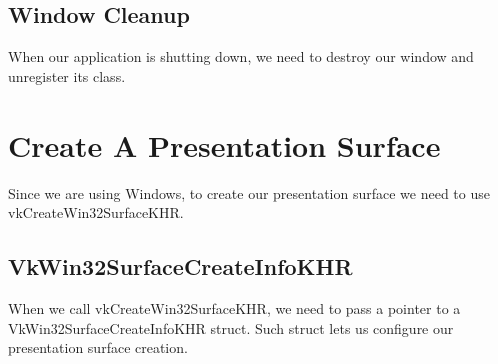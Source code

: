 \begin{minipage}{\linewidth}{\noindent}
    
\end{minipage}

\subsection{Window Cleanup}

When our application is shutting down, we need to destroy our window and unregister
its class.

\begin{minipage}{\linewidth}{\noindent}
    
\end{minipage}

\section{Create A Presentation Surface}

Since we are using Windows, to create our presentation surface we need
to use vkCreateWin32SurfaceKHR.

\begin{minipage}{\linewidth}{\noindent}
    
\end{minipage}

\subsection{VkWin32SurfaceCreateInfoKHR}

When we call vkCreateWin32SurfaceKHR, we need to pass a pointer to a
VkWin32SurfaceCreateInfoKHR struct.
Such struct lets us configure our presentation surface creation.

\begin{minipage}{\linewidth}{\noindent}
    
\end{minipage}

